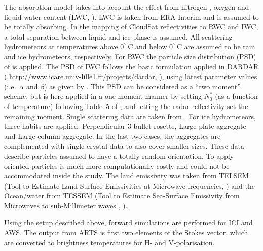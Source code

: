 \documentclass[amt, manuscript]{copernicus}
\begin{document}
The absorption model takes into account the effect from nitrogen
\citep{pwr:93}, oxygen \citep{pwr:93} and liquid water content (LWC, \citet{ellison2007permittivity}). LWC is taken from ERA-Interim  and is assumed to be totally absorbing. In the mapping of CloudSat reflectivities to RWC and IWC, a total separation between liquid and ice phase is assumed. All scattering hydrometeors at temperatures above 0$^{^{\circ}}$C and below 0$^{^{\circ}}$C are assumed to be rain and ice hydrometeors, respectively. For RWC the particle size
distribution (PSD) of \citet{abel2012improved} is applied. The PSD of IWC follows the basic formulation applied in DARDAR (\url{
http://www.icare.univ-lille1.fr/projects/dardar}, \citet{delanoe2008variational}), using latest parameter
values (i.e.\ $\alpha$ and $\beta$) as given by \citet{cazenave2019evolution}.
This PSD can be considered as a ``two moment'' scheme, but is here applied in
a one moment manner by setting $N_0^*$ (as a function of temperature)
following Table~5 of \citet{delanoe2014normalized}, and letting the radar
reflectivity set the remaining moment. Single scattering data are taken from
\citet{eriksson:agene:18}. For ice hydrometeors, three habits are applied:
Perpendicular 3-bullet rosette, Large plate aggregate and Large column
aggregate. In the last two cases, the aggregates are complemented with single
crystal data to also cover smaller sizes. These data describe particles
assumed to have a totally random orientation. To apply oriented particles is
much more computationally costly and could not be accommodated inside the
study. The land emissivity was taken from TELSEM (Tool to Estimate Land‐Surface Emissivities at Microwave frequencies, \citet{aires2011tool}) and the
Ocean/water from TESSEM (Tool to Estimate Sea‐Surface Emissivity from Microwaves to sub‐Millimeter waves , \citet{prigent2017sea}).

Using the setup described above, forward simulations are performed for ICI and AWS. The output from ARTS is first two elements of the Stokes vector,  which are converted to brightness temperatures for H- and V-polarisation. 
\end{document}
